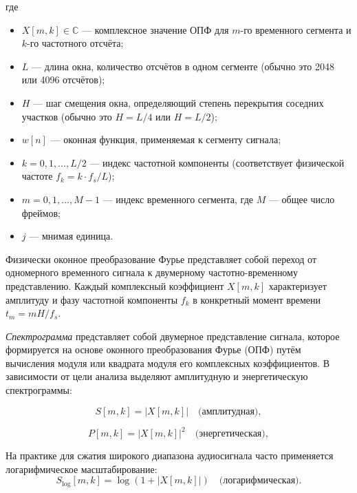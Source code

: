 \documentclass[14pt]{extarticle}
\begin{document}
где 
\begin{itemize}[label=$\bullet$, wide]
	\item $X[m, k] \in \mathbb{C}$ --- комплексное значение ОПФ для $m$-го временного сегмента и $k$-го частотного отсчёта;
	\item $L$ --- длина окна, количество отсчётов в одном сегменте (обычно это 2048 или 4096 отсчётов);
	\item $H$ --- шаг смещения окна, определяющий степень перекрытия соседних участков (обычно это $H = L/4$ или $H = L/2$);
	\item $w[n]$ --- оконная функция, применяемая к сегменту сигнала;
	\item $k = 0, 1, \dots, L/2$ --- индекс частотной компоненты  (соответствует физической частоте $f_k = k \cdot f_s / L$);
	\item $m = 0, 1, \dots, M-1$ --- индекс временного сегмента, где $M$ --- общее число фреймов;
	\item $j$ --- мнимая единица.
\end{itemize}

Физически оконное преобразование Фурье представляет собой переход от одномерного временного сигнала к двумерному 
частотно-временному представлению. 
Каждый комплексный коэффициент $X[m, k]$ характеризует амплитуду и фазу частотной компоненты $f_k$ в конкретный момент времени $t_m = mH/f_s$.

\par\textit{Спектрограмма} представляет собой двумерное представление сигнала, которое формируется на основе оконного 
преобразования Фурье (ОПФ) путём вычисления модуля или квадрата модуля его комплексных коэффициентов. 
В зависимости от цели анализа выделяют амплитудную и энергетическую спектрограммы:

\begin{equation*}
    S[m, k] = \lvert X[m, k] \rvert \quad \text{(амплитудная)},
    \label{eq:amp_spectrogram}
\end{equation*}

\begin{equation*}
    P[m, k] = \lvert X[m, k] \rvert^2 \quad \text{(энергетическая)},
    \label{eq:power_spectrogram}
\end{equation*}

На практике для сжатия широкого диапазона аудиосигнала часто применяется логарифмическое масштабирование:
\begin{equation*}
    S_{\text{log}}[m, k] = \log\left(1 + \lvert X[m, k] \rvert\right) \quad \text{(логарифмическая)}.
    \label{eq:log_spectrogram}
\end{equation*}
\end{document}
